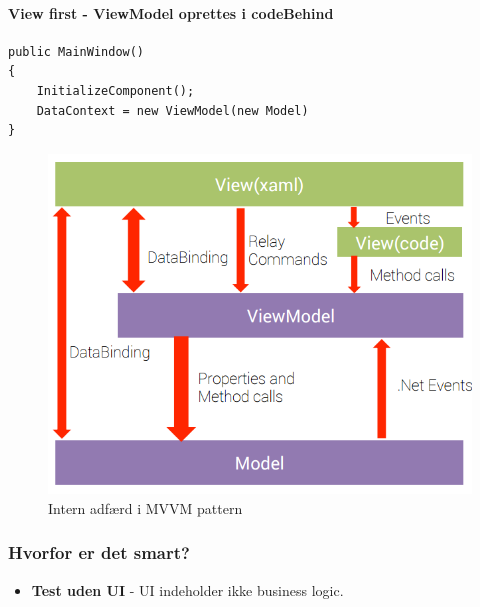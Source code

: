 \paragraph{View first - ViewModel oprettes i codeBehind}

\begin{lstlisting}[caption=ViewModel oprettes i views codeBehind]
public MainWindow()
{
	InitializeComponent();
	DataContext = new ViewModel(new Model)
}
\end{lstlisting}


\begin{figure}[H]
\centering
\includegraphics[width=0.7\linewidth]{figs/MVVM/mvvmPatternComplex}
\caption{Intern adfærd i MVVM pattern}
\label{fig:mvvmPatternComplex}
\end{figure}

\subsubsection{Hvorfor er det smart?}

\begin{itemize}
	\item \textbf{Test uden UI} - UI indeholder ikke business logic.
\end{itemize}




